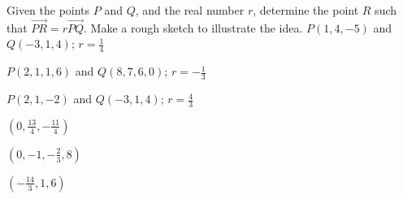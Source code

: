 

\begin{Exercise}[
name={},
title={}, 
difficulty=0,
origin={\cite{SM}}]
Given the points $P$ and $Q$, and the real number $r$, determine the point $R$ such that $\overrightarrow{PR}=r\overrightarrow{PQ}$. Make a rough sketch to illustrate the idea.
\Question $P(1,4,-5)$ and $Q(-3,1,4)$; $r=\frac{1}{4}$

\Question $P(2,1,1,6)$ and $Q(8,7,6,0)$; $r=-\frac{1}{3}$

\Question $P(2,1,-2)$ and $Q(-3,1,4)$; $r=\frac{4}{3}$
\end{Exercise}

\begin{Answer}
\Question $\left(0,\frac{13}{4},-\frac{11}{4}\right)$

\Question $\left(0,-1,-\frac{2}{3},8\right)$

\Question $\left(-\frac{14}{3},1,6\right)$
\end{Answer}
